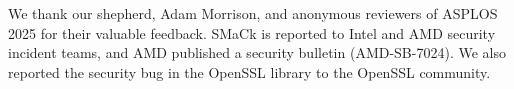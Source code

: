 \begin{acks}
We thank our shepherd, Adam Morrison, and anonymous reviewers of ASPLOS 2025 for their valuable feedback.
SMaCk is reported to Intel and AMD security incident teams, and AMD published a security bulletin (AMD-SB-7024). We also reported the security bug in the OpenSSL library to the OpenSSL community. 
\end{acks}